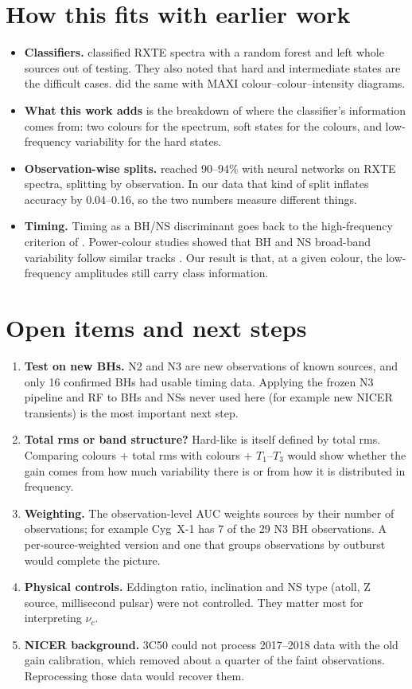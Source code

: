 \documentclass[11pt,a4paper]{article}
\begin{document}
\section{How this fits with earlier work}
\begin{itemize}[leftmargin=1.4em]
\item \textbf{Classifiers.} \citet{Pattnaik2021} classified RXTE spectra with a random forest and left whole sources out
of testing. They also noted that hard and intermediate states are the difficult cases. \citet{deBeurs2022} did the
same with MAXI colour--colour--intensity diagrams.
\item \textbf{What this work adds} is the breakdown of where the classifier's information comes from: two colours for
the spectrum, soft states for the colours, and low-frequency variability for the hard states.
\item \textbf{Observation-wise splits.} \citet{Garg2026} reached 90--94\% with neural networks on RXTE spectra, splitting
by observation. In our data that kind of split inflates accuracy by 0.04--0.16, so the two numbers measure different
things.
\item \textbf{Timing.} Timing as a BH/NS discriminant goes back to the high-frequency criterion of
\citet{SunyaevRevnivtsev2000}. Power-colour studies showed that BH and NS broad-band variability follow similar tracks
\citep{Heil2015,GardenierUttley2018}. Our result is that, at a given colour, the low-frequency amplitudes still carry
class information.
\end{itemize}

\section{Open items and next steps}
\begin{enumerate}[leftmargin=1.4em]
\item \textbf{Test on new BHs.} N2 and N3 are new observations of known sources, and only 16 confirmed BHs had usable
timing data. Applying the frozen N3 pipeline and RF to BHs and NSs never used here (for example new NICER transients)
is the most important next step.
\item \textbf{Total rms or band structure?} Hard-like is itself defined by total rms. Comparing colours + total rms
with colours + $T_1$--$T_3$ would show whether the gain comes from how much variability there is or from how it is
distributed in frequency.
\item \textbf{Weighting.} The observation-level AUC weights sources by their number of observations; for example
Cyg~X-1 has 7 of the 29 N3 BH observations. A per-source-weighted version and one that groups observations by outburst
would complete the picture.
\item \textbf{Physical controls.} Eddington ratio, inclination and NS type (atoll, Z source, millisecond pulsar) were
not controlled. They matter most for interpreting $\nu_c$.
\item \textbf{NICER background.} 3C50 could not process 2017--2018 data with the old gain calibration, which removed
about a quarter of the faint observations. Reprocessing those data would recover them.
\end{enumerate}
\end{document}
